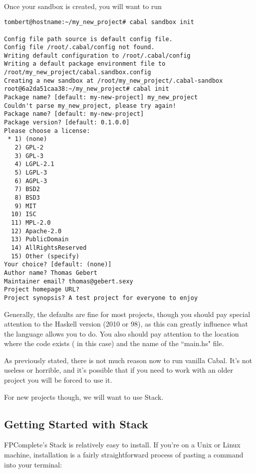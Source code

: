 \paragraph{}
Once your sandbox is created, you will want to run 

\begin{verbatim}
tombert@hostname:~/my_new_project# cabal sandbox init

Config file path source is default config file.
Config file /root/.cabal/config not found.
Writing default configuration to /root/.cabal/config 
Writing a default package environment file to
/root/my_new_project/cabal.sandbox.config
Creating a new sandbox at /root/my_new_project/.cabal-sandbox
root@6a2da51caa38:~/my_new_project# cabal init
Package name? [default: my-new-project] my_new_project 
Couldn't parse my_new_project, please try again!
Package name? [default: my-new-project]
Package version? [default: 0.1.0.0] 
Please choose a license:
 * 1) (none)        
   2) GPL-2
   3) GPL-3
   4) LGPL-2.1
   5) LGPL-3
   6) AGPL-3
   7) BSD2
   8) BSD3
   9) MIT
  10) ISC
  11) MPL-2.0
  12) Apache-2.0
  13) PublicDomain
  14) AllRightsReserved
  15) Other (specify)
Your choice? [default: (none)]
Author name? Thomas Gebert
Maintainer email? thomas@gebert.sexy
Project homepage URL?
Project synopsis? A test project for everyone to enjoy

\end{verbatim}

Generally, the defaults are fine for most projects, though you should pay special attention to the Haskell version (2010 or 98), as this can greatly influence what the language allows you to do.  You also should pay attention to the location where the code exists ( in this case) and the name of the ``main.hs" file. 

As previously stated, there is not much reason now to run vanilla Cabal.  It's not useless or horrible, and it's possible that if you need to work with an older project you will be forced to use it. 

For new projects though, we will want to use Stack.

\subsection{Getting Started with Stack}

FPComplete's Stack is relatively easy to install.  If you're on a Unix or Linux machine, installation is a fairly straightforward process of pasting a command into your terminal: 


